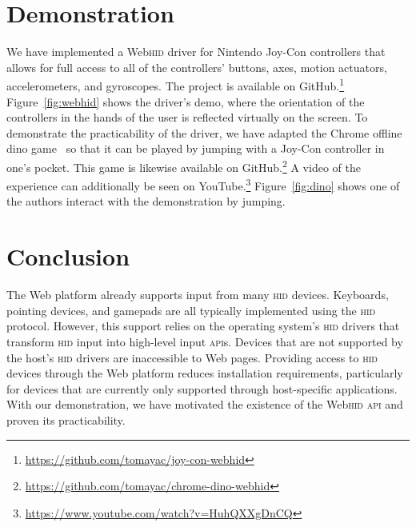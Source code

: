\documentclass[sigconf]{acmart}
\begin{document}
\section{Demonstration}

We have implemented a Web\textsc{hid} driver for Nintendo Joy-Con controllers
that allows for full access to all of the controllers' buttons, axes,
motion actuators, accelerometers, and gyroscopes.
The project is available on GitHub.\footnote{\url{https://github.com/tomayac/joy-con-webhid}}
Figure~\ref{fig:webhid} shows the driver's demo, where the orientation of the controllers
in the hands of the user is reflected virtually on the screen. 
To demonstrate the practicability of the driver, we have adapted the Chrome offline dino game~\cite{dino18}
so that it can be played by jumping with a Joy-Con controller in one's pocket.
This game is likewise available on GitHub.\footnote{\url{https://github.com/tomayac/chrome-dino-webhid}}
A video of the experience can additionally be seen on
YouTube.\footnote{\url{https://www.youtube.com/watch?v=HuhQXXgDnCQ}}
Figure~\ref{fig:dino} shows one of the authors interact with the demonstration
by jumping.

\section{Conclusion}

The Web platform already supports input from many \textsc{hid} devices.
Keyboards, pointing devices, and gamepads are all typically implemented
using the \textsc{hid} protocol.
However, this support relies on the operating system's \textsc{hid} drivers
that transform \textsc{hid} input into high-level input \textsc{api}s.
Devices that are not supported by the host's \textsc{hid} drivers are
inaccessible to Web pages.
Providing access to \textsc{hid} devices through the Web platform
reduces installation requirements, particularly for devices that are
currently only supported through host-specific applications.
With our demonstration, we have motivated the existence of 
the Web\textsc{hid} \textsc{api} and proven its practicability.
\end{document}
